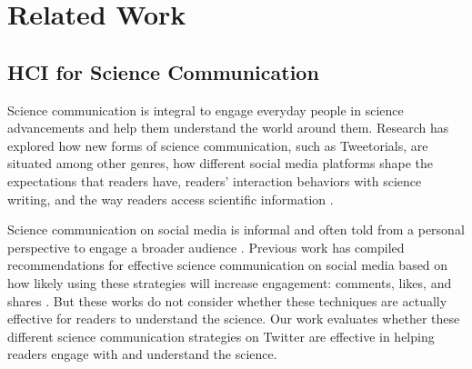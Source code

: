 \section{Related Work}

\subsection{HCI for Science Communication}



Science communication is integral to engage everyday people in science advancements and help them understand the world around them. Research has explored how new forms of science communication, such as Tweetorials, are situated among other genres, how different social media platforms shape the expectations that readers have, readers' interaction behaviors with science writing, and the way readers access scientific information \cite{heyd2015digital, williams2022hci, hargittai2018young, tardy2023spread}. 


Science communication on social media is informal and often told from a personal perspective to engage a broader audience \cite{10.1145/3479566}. Previous work has compiled recommendations for effective science communication on social media based on how likely using these strategies will increase engagement: comments, likes, and shares  \cite{zhang2022no, bik2015ten, fontaine2019communicating}. But these works do not consider whether these techniques are actually effective for readers to understand the science. Our work evaluates whether these different science communication strategies on Twitter are effective in helping readers engage with and understand the science.  

